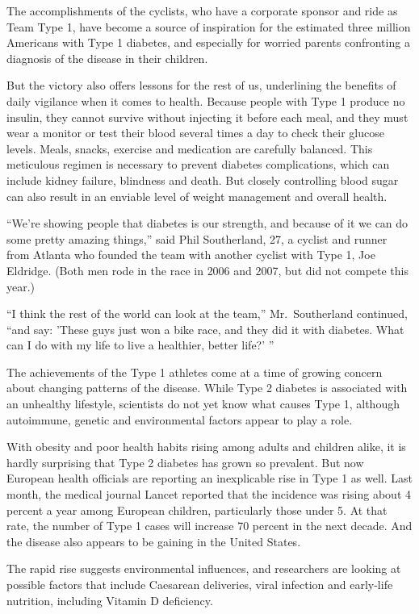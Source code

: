 ﻿\documentclass[12pt]{article}
\begin{document}
The accomplishments of the cyclists, who have a corporate sponsor and ride as Team Type 1, have
become a source of inspiration for the estimated three million Americans with Type 1 diabetes, and
especially for worried parents confronting a diagnosis of the disease in their children.

But the victory also offers lessons for the rest of us, underlining the benefits of daily vigilance
when it comes to health. Because people with Type 1 produce no insulin, they cannot survive without
injecting it before each meal, and they must wear a monitor or test their blood several times a day
to check their glucose levels. Meals, snacks, exercise and medication are carefully balanced. This
meticulous regimen is necessary to prevent diabetes complications, which can include kidney failure,
blindness and death. But closely controlling blood sugar can also result in an enviable level of
weight management and overall health.

``We're showing people that diabetes is our strength, and because of it we can do some pretty
amazing things,'' said Phil Southerland, 27, a cyclist and runner from Atlanta who founded the team
with another cyclist with Type 1, Joe Eldridge. (Both men rode in the race in 2006 and 2007, but did
not compete this year.)

``I think the rest of the world can look at the team,'' Mr.~Southerland continued, ``and say: 'These
guys just won a bike race, and they did it with diabetes. What can I do with my life to live a
healthier, better life?' ''

The achievements of the Type 1 athletes come at a time of growing concern about changing patterns of
the disease. While Type 2 diabetes is associated with an unhealthy lifestyle, scientists do not yet
know what causes Type 1, although autoimmune, genetic and environmental factors appear to play a
role.

With obesity and poor health habits rising among adults and children alike, it is hardly surprising
that Type 2 diabetes has grown so prevalent. But now European health officials are reporting an
inexplicable rise in Type 1 as well. Last month, the medical journal Lancet reported that the
incidence was rising about 4 percent a year among European children, particularly those under 5. At
that rate, the number of Type 1 cases will increase 70 percent in the next decade. And the disease
also appears to be gaining in the United States.

The rapid rise suggests environmental influences, and researchers are looking at possible factors
that include Caesarean deliveries, viral infection and early-life nutrition, including Vitamin D
deficiency.
\end{document}
